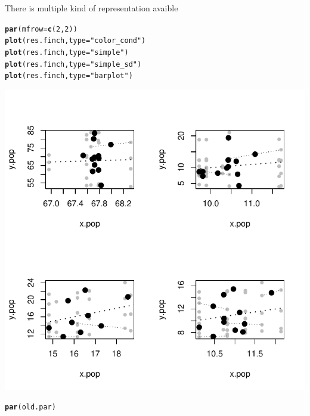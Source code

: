 \documentclass[12pt]{article}\usepackage[]{graphicx}\usepackage[]{color}
\makeatletter
\def\maxwidth{ %
  \ifdim\Gin@nat@width>\linewidth
    \linewidth
  \else
    \Gin@nat@width
  \fi
}
\newcommand{\hlnum}[1]{\textcolor[rgb]{0.686,0.059,0.569}{#1}}%
\newcommand{\hlstr}[1]{\textcolor[rgb]{0.192,0.494,0.8}{#1}}%
\newcommand{\hlstd}[1]{\textcolor[rgb]{0.345,0.345,0.345}{#1}}%
\newcommand{\hlkwc}[1]{\textcolor[rgb]{0.333,0.667,0.333}{#1}}%
\newcommand{\hlkwd}[1]{\textcolor[rgb]{0.737,0.353,0.396}{\textbf{#1}}}%
\newenvironment{kframe}{%
 \def\at@end@of@kframe{}%
 \ifinner\ifhmode%
  \def\at@end@of@kframe{\end{minipage}}%
  \begin{minipage}{\columnwidth}%
 \fi\fi%
 \def\FrameCommand##1{\hskip\@totalleftmargin \hskip-\fboxsep
 \colorbox{shadecolor}{##1}\hskip-\fboxsep
     \hskip-\linewidth \hskip-\@totalleftmargin \hskip\columnwidth}%
 \MakeFramed {\advance\hsize-\width
   \@totalleftmargin\z@ \linewidth\hsize
   \@setminipage}}%
 {\par\unskip\endMakeFramed%
 \at@end@of@kframe}
\newenvironment{knitrout}{}{} %
\makeatother
\begin{document}
There is multiple kind of representation avaible
\begin{knitrout}
\color{fgcolor}\begin{kframe}
\begin{alltt}
\hlkwd{par}\hlstd{(}\hlkwc{mfrow}\hlstd{=}\hlkwd{c}\hlstd{(}\hlnum{2}\hlstd{,}\hlnum{2}\hlstd{))}
\hlkwd{plot}\hlstd{(res.finch,} \hlkwc{type}\hlstd{=}\hlstr{"color_cond"}\hlstd{)}
\hlkwd{plot}\hlstd{(res.finch,} \hlkwc{type}\hlstd{=}\hlstr{"simple"}\hlstd{)}
\hlkwd{plot}\hlstd{(res.finch,} \hlkwc{type}\hlstd{=}\hlstr{"simple_sd"}\hlstd{)}
\hlkwd{plot}\hlstd{(res.finch,} \hlkwc{type}\hlstd{=}\hlstr{"barplot"}\hlstd{)}
\end{alltt}
\end{kframe}

{\centering \includegraphics[width=\maxwidth]{figure/unnamed-chunk-30} 

}


\begin{kframe}\begin{alltt}
\hlkwd{par}\hlstd{(old.par)}
\end{alltt}
\end{kframe}
\end{knitrout}

\newpage
\end{document}
